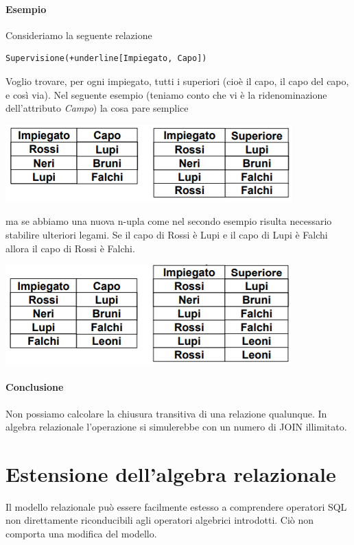 \paragraph{Esempio} Consideriamo la seguente relazione
\begin{Verbatim}[commandchars=+\[\]]
	Supervisione(+underline[Impiegato, Capo])
\end{Verbatim}
Voglio trovare, per ogni impiegato, tutti i superiori (cioè il capo, il capo del capo, e così via). Nel seguente esempio (teniamo conto che vi è la ridenominazione dell'attributo \emph{Campo}) la cosa pare semplice
\begin{center}
	\includegraphics{images/140.PNG}
\end{center}
ma se abbiamo una nuova n-upla come nel secondo esempio risulta necessario stabilire ulteriori legami. Se il capo di Rossi è Lupi e il capo di Lupi è Falchi allora il capo di Rossi è Falchi.
\begin{center}
	\includegraphics{images/141.PNG}
\end{center}
\paragraph{Conclusione} Non possiamo calcolare la chiusura transitiva di una relazione qualunque. In algebra relazionale l'operazione si simulerebbe con un numero di JOIN illimitato.

\section{Estensione dell'algebra relazionale}
Il modello relazionale può essere facilmente estesso a comprendere operatori SQL non direttamente riconducibili agli operatori algebrici introdotti. Ciò non comporta una modifica del modello.
